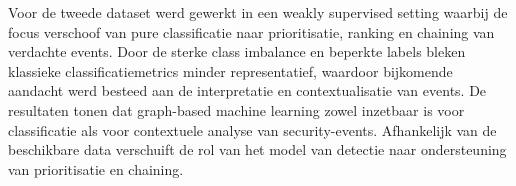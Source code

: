 \newline
\newline
Voor de tweede dataset werd gewerkt in een weakly supervised setting waarbij de focus verschoof van pure classificatie naar prioritisatie, ranking en chaining van verdachte events. Door de sterke class imbalance en beperkte labels bleken klassieke classificatiemetrics minder representatief, waardoor bijkomende aandacht werd besteed aan de interpretatie en contextualisatie van events.
\newline
\newline
De resultaten tonen dat graph-based machine learning zowel inzetbaar is voor classificatie als voor contextuele analyse van security-events. Afhankelijk van de beschikbare data verschuift de rol van het model van detectie naar ondersteuning van prioritisatie en chaining.